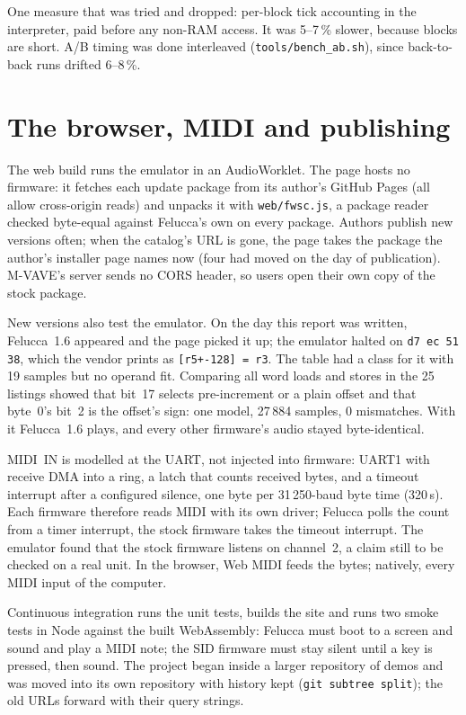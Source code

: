 \documentclass[10pt,a4paper]{article}
\newcommand{\code}[1]{\texttt{#1}}
\begin{document}
One measure that was tried and dropped: per-block tick accounting in the interpreter, paid before
any non-RAM access. It was 5--7\,\% slower, because blocks are short. A/B timing was done
interleaved (\code{tools/bench\_ab.sh}), since back-to-back runs drifted 6--8\,\%.

\section{The browser, MIDI and publishing}

The web build runs the emulator in an AudioWorklet. The page hosts no firmware: it fetches each
update package from its author's GitHub Pages (all allow cross-origin reads) and unpacks it with
\code{web/fwsc.js}, a package reader checked byte-equal against Felucca's own on every package.
Authors publish new versions often; when the catalog's URL is gone, the page takes the package the
author's installer page names now (four had moved on the day of publication). M-VAVE's server sends
no CORS header, so users open their own copy of the stock package.

New versions also test the emulator. On the day this report was written, Felucca~1.6 appeared and
the page picked it up; the emulator halted on \code{d7 ec 51 38}, which the vendor prints as
\code{[r5+-128] = r3}. The table had a class for it with 19 samples but no operand fit. Comparing
all word loads and stores in the 25 listings showed that bit~17 selects pre-increment or a plain
offset and that byte~0's bit~2 is the offset's sign: one model, 27\,884 samples, 0 mismatches. With
it Felucca~1.6 plays, and every other firmware's audio stayed byte-identical.

MIDI~IN is modelled at the UART, not injected into firmware: UART1 with receive DMA into a ring, a
latch that counts received bytes, and a timeout interrupt after a configured silence, one byte per
31\,250-baud byte time (320\,\textmu s). Each firmware therefore reads MIDI with its own driver;
Felucca polls the count from a timer interrupt, the stock firmware takes the timeout interrupt. The
emulator found that the stock firmware listens on channel~2, a claim still to be checked on a real
unit. In the browser, Web MIDI feeds the bytes; natively, every MIDI input of the computer.

Continuous integration runs the unit tests, builds the site and runs two smoke tests in Node
against the built WebAssembly: Felucca must boot to a screen and sound and play a MIDI note; the
SID firmware must stay silent until a key is pressed, then sound. The project began inside a
larger repository of demos and was moved into its own repository with history kept
(\code{git subtree split}); the old URLs forward with their query strings.
\end{document}
